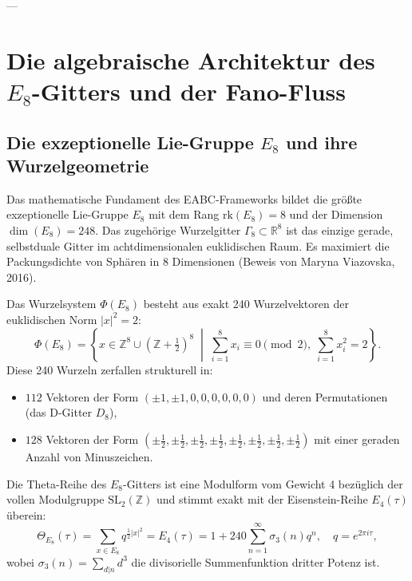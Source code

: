 \documentclass[11pt,a4paper]{article}
\theoremstyle{definition}
\theoremstyle{remark}
\numberwithin{equation}{section}
\begin{document}
---

\section{Die algebraische Architektur des $E_8$-Gitters und der Fano-Fluss}

\subsection{Die exzeptionelle Lie-Gruppe $E_8$ und ihre Wurzelgeometrie}

Das mathematische Fundament des EABC-Frameworks bildet die größte exzeptionelle Lie-Gruppe $E_8$ mit dem Rang $\mathrm{rk}(E_8) = 8$ und der Dimension $\dim(E_8) = 248$. Das zugehörige Wurzelgitter $\Gamma_8 \subset \mathbb{R}^8$ ist das einzige gerade, selbstduale Gitter im achtdimensionalen euklidischen Raum. Es maximiert die Packungsdichte von Sphären in 8 Dimensionen (Beweis von Maryna Viazovska, 2016).

Das Wurzelsystem $\Phi(E_8)$ besteht aus exakt 240 Wurzelvektoren der euklidischen Norm $|x|^2 = 2$:
\begin{equation}
\Phi(E_8) = \left\{ x \in \mathbb{Z}^8 \cup \left(\mathbb{Z} + \tfrac{1}{2}\right)^8 \;\middle|\; \sum_{i=1}^8 x_i \equiv 0 \pmod 2, \; \sum_{i=1}^8 x_i^2 = 2 \right\}.
\end{equation}
Diese 240 Wurzeln zerfallen strukturell in:
\begin{itemize}
    \item $112$ Vektoren der Form $(\pm 1, \pm 1, 0, 0, 0, 0, 0, 0)$ und deren Permutationen (das D-Gitter $D_8$),
    \item $128$ Vektoren der Form $\left(\pm \frac{1}{2}, \pm \frac{1}{2}, \pm \frac{1}{2}, \pm \frac{1}{2}, \pm \frac{1}{2}, \pm \frac{1}{2}, \pm \frac{1}{2}, \pm \frac{1}{2}\right)$ mit einer geraden Anzahl von Minuszeichen.
\end{itemize}

Die Theta-Reihe des $E_8$-Gitters ist eine Modulform vom Gewicht 4 bezüglich der vollen Modulgruppe $\mathrm{SL}_2(\mathbb{Z})$ und stimmt exakt mit der Eisenstein-Reihe $E_4(\tau)$ überein:
\begin{equation}
\Theta_{E_8}(\tau) = \sum_{x \in E_8} q^{\frac{1}{2}|x|^2} = E_4(\tau) = 1 + 240 \sum_{n=1}^\infty \sigma_3(n) q^n, \quad q = e^{2\pi i \tau},
\end{equation}
wobei $\sigma_3(n) = \sum_{d|n} d^3$ die divisorielle Summenfunktion dritter Potenz ist.
\end{document}
